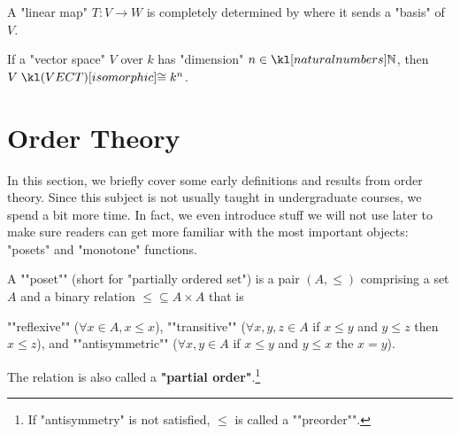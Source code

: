 \documentclass[main.tex]{subfiles}
\begin{document}
\begin{prop}
	A "linear map" $T: V \rightarrow W$ is completely determined by where it sends a "basis" of $V$.
\end{prop}
\begin{prop}
	If a "vector space" $V$ over $k$ has "dimension" $n\in \N$, then $V \isoVECT k^n$.
\end{prop}
\begin{defn}[Dual]
	
\end{defn}
\section{Order Theory}
In this section, we briefly cover some early definitions and results from order theory. Since this subject is not usually taught in undergraduate courses, we spend a bit more time. In fact, we even introduce stuff we will not use later to make sure readers can get more familiar with the most important objects: "posets" and "monotone" functions.
\begin{defn}[Poset]
	\AP A ""poset"" (short for "partially ordered set") is a pair $(A, \leq)$ comprising a set $A$ and a binary relation ${\leq}\subseteq A \times A$ that is 
    \begin{enumerate}
        \itemAP ""reflexive"" ($\forall x \in A, x \leq x$),
        \itemAP ""transitive"" ($\forall x,y,z \in A$ if $x \leq y$ and $y \leq z$ then $x \leq z$), and
        \itemAP ""antisymmetric"" ($\forall x,y \in A$ if $x\leq y$ and $y\leq x$ the $x = y$).
    \end{enumerate}
    The relation is also called a \textbf{"partial order"}.\footnote{\AP If "antisymmetry" is not satisfied, $\leq$ is called a ""preorder"".}
\end{defn}
\end{document}
